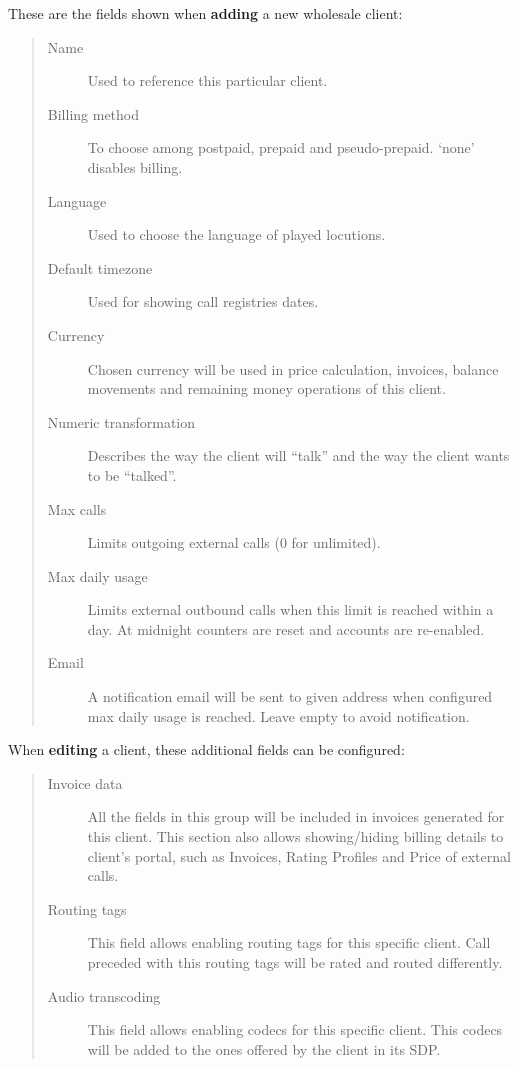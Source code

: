 \documentclass[letterpaper,10pt,english]{sphinxmanual}
\begin{document}
These are the fields shown when \textbf{adding} a new wholesale client:
\begin{quote}
\begin{description}
\item[{Name}] \leavevmode
Used to reference this particular client.

\item[{Billing method}] \leavevmode
To choose among postpaid, prepaid and pseudo-prepaid. `none' disables billing.

\item[{Language}] \leavevmode
Used to choose the language of played locutions.

\item[{Default timezone}] \leavevmode
Used for showing call registries dates.

\item[{Currency}] \leavevmode
Chosen currency will be used in price calculation, invoices, balance movements and
remaining money operations of this client.

\item[{Numeric transformation}] \leavevmode
Describes the way the client will ``talk'' and the way the client wants to be ``talked''.

\item[{Max calls}] \leavevmode
Limits outgoing external calls (0 for unlimited).

\item[{Max daily usage}] \leavevmode
Limits external outbound calls when this limit is reached within a day. At midnight counters are reset and
accounts are re-enabled.

\item[{Email}] \leavevmode
A notification email will be sent to given address when configured max daily usage is reached. Leave empty to
avoid notification.

\end{description}
\end{quote}

When \textbf{editing} a client, these additional fields can be configured:
\begin{quote}
\begin{description}
\item[{Invoice data}] \leavevmode
All the fields in this group will be included in invoices generated for this client. This section also allows
showing/hiding billing details to client's portal, such as Invoices, Rating Profiles and Price of external calls.

\item[{Routing tags}] \leavevmode
This field allows enabling routing tags for this specific client. Call preceded with this
routing tags will be rated and routed differently.

\item[{Audio transcoding}] \leavevmode
This field allows enabling codecs for this specific client. This codecs will be added to
the ones offered by the client in its SDP.

\end{description}
\end{quote}
\end{document}
